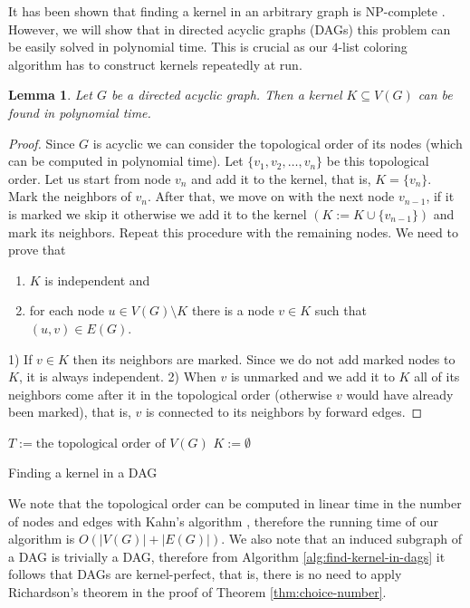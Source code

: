 \documentclass[a4paper, 12pt]{article}
\newtheorem{lem}{Lemma}[section]
\begin{document}
It has been shown that finding a kernel in an arbitrary graph is $\mathrm{NP}$-complete \cite{chvatal}. However, we will show that in directed acyclic graphs (DAGs) this problem can be easily solved in polynomial time. This is crucial as our $4$-list coloring algorithm has to construct kernels repeatedly at run.

\begin{lem}\label{lem:kernel-lemma} Let $G$ be a directed acyclic graph. Then a kernel $K \subseteq V(G)$ can be found in polynomial time.
\end{lem}
\begin{proof} Since $G$ is acyclic we can consider the topological order of its nodes (which can be computed in polynomial time). Let $\lbrace v_1, v_2, \ldots, v_n \rbrace$ be this topological order. Let us start from node $v_n$ and add it to the kernel, that is, $K = \lbrace v_n \rbrace$. Mark the neighbors of $v_n$. After that, we move on with the next node $v_{n-1}$, if it is marked we skip it otherwise we add it to the kernel $(K := K \cup \lbrace v_{n-1} \rbrace)$ and mark its neighbors. Repeat this procedure with the remaining nodes. We need to prove that
\begin{enumerate}
\item $K$ is independent and
\item for each node $u \in V(G) \setminus K$ there is a node $v \in K$ such that $(u,v) \in E(G)$.
\end{enumerate}
1) If $v \in K$ then its neighbors are marked. Since we do not add marked nodes to $K$, it is always independent.
2) When $v$ is unmarked and we add it to $K$ all of its neighbors come after it in the topological order (otherwise $v$ would have already been marked), that is, $v$ is connected to its neighbors by forward edges.
\end{proof}
\begin{algorithm}[h!]\label{alg:find-kernel-in-dags}
 $T := \text{the topological order of $V(G)$}$\;
 $K := \emptyset$\;
 \caption{Finding a kernel in a DAG}
\end{algorithm}

We note that the topological order can be computed in linear time in the number of nodes and edges with Kahn's algorithm \cite{Kahn:1962:TSL:368996.369025}, therefore the running time of our algorithm is $O(|V(G)|+|E(G)|)$. We also note that an induced subgraph of a DAG is trivially a DAG, therefore from Algorithm \ref{alg:find-kernel-in-dags} it follows that DAGs are kernel-perfect, that is, there is no need to apply Richardson's theorem in the proof of Theorem \ref{thm:choice-number}. 
\end{document}
